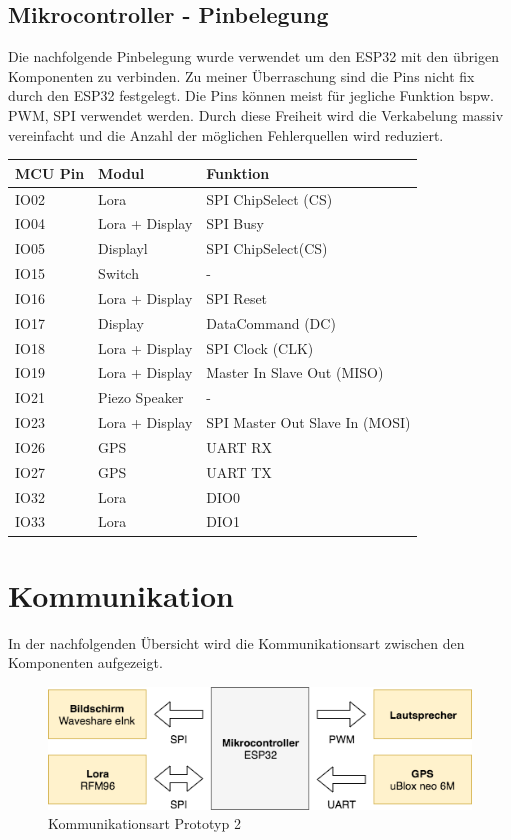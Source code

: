 \documentclass[11pt,english,german]{report}
\theoremstyle{definition}
\begin{document}
\newpage
\subsection{Mikrocontroller - Pinbelegung}
Die nachfolgende Pinbelegung wurde verwendet um den ESP32 mit den übrigen Komponenten zu verbinden. Zu meiner Überraschung sind die Pins nicht fix durch den ESP32 festgelegt. Die Pins können meist für jegliche Funktion bspw. PWM, SPI verwendet werden. Durch diese Freiheit wird die Verkabelung massiv vereinfacht und die Anzahl der möglichen Fehlerquellen wird reduziert.\\
\begin{tabularx}{\textwidth}{ l|l|X }
	\textbf{MCU Pin} & \textbf{Modul} & \textbf{Funktion}\\ \hline
	IO02 & Lora & SPI ChipSelect (CS)\\\hline
	IO04 & Lora + Display& SPI Busy\\ \hline
	IO05 & Displayl& SPI ChipSelect(CS)\\\hline
	IO15 & Switch & -\\ \hline
	IO16 & Lora + Display & SPI Reset\\\hline
	IO17 & Display&  DataCommand (DC)\\ \hline
	IO18 & Lora + Display & SPI Clock (CLK)\\ \hline
	IO19 & Lora + Display & Master In Slave Out (MISO) \\\hline
	IO21 & Piezo Speaker & - \\ \hline
	IO23 & Lora + Display & SPI Master Out Slave In (MOSI) \\\hline
	IO26 & GPS & UART RX\\ \hline
	IO27 & GPS & UART TX\\ \hline
	IO32 & Lora & DIO0\\ \hline
	IO33 & Lora & DIO1\\ \hline
\end{tabularx}

\section{Kommunikation}
In der nachfolgenden Übersicht wird die Kommunikationsart zwischen den Komponenten aufgezeigt.\\
\begin{figure}[H]
	\centering
	\includegraphics[width=\textwidth]{img/system/ATASNode2_Kommunikation.png}
	\caption[Kommunikationsart Prototyp 2]
	{Kommunikationsart Prototyp 2}
\end{figure}
\end{document}
